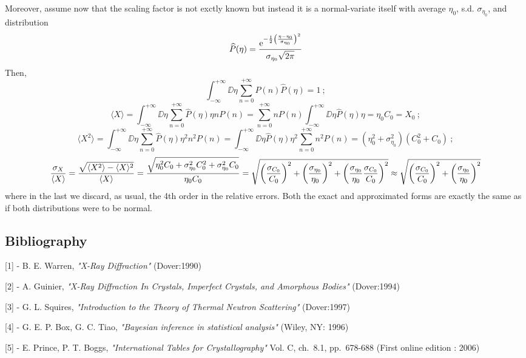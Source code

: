 Moreover, assume now that the scaling factor is not exctly known 
but instead it is a normal-variate itself with average $\eta_0$, s.d. 
$\sigma_{\eta_0}$, and distribution
\[
\widehat{P}(\eta)={\displaystyle{\frac{{\ensuremath{\displaystyle{
{\ensuremath{\mathrm{e}}}^{
-\frac{1}{2}
{\ensuremath{\left({
\frac{\eta-\eta_0}{\sigma_{\eta_0}}
}\right)}}^2
}
}}}}{{\ensuremath{\displaystyle{
\sigma_{\eta_0}\sqrt{2\pi}
}}}}}}
\]
Then,
\[
\int_{-\infty}^{+\infty}\DD{\eta}\mathop{\sum}_{n=0}^{+\infty}
P(n)\widehat{P}(\eta)=1\ ;
\]
\[
\langle X\rangle=\int_{-\infty}^{+\infty}\DD{\eta}\mathop{\sum}_{n=0}^{+\infty}
\widehat{P}(\eta)\eta nP(n)=
\mathop{\sum}_{n=0}^{+\infty}
 nP(n)
\int_{-\infty}^{+\infty}\DD{\eta} \widehat{P}(\eta)\eta
 =
\eta_0 C_0=X_0\ ;
\]
\[
\langle X^2\rangle=\int_{-\infty}^{+\infty}\DD{\eta}\mathop{\sum}_{n=0}^{+\infty}
\widehat{P}(\eta)\eta^2 n^2 P(n)=
\int_{-\infty}^{+\infty}\DD{\eta}\widehat{P}(\eta)\eta^2
\mathop{\sum}_{n=0}^{+\infty}
 n^2 P(n)
=
(\eta_0^2+\sigma_{\eta_0}^2)(C_0^2+C_0)\ ;
\]
\[
{\displaystyle{\frac{{\ensuremath{\displaystyle{\sigma_X}}}}{{\ensuremath{\displaystyle{\langle X\rangle}}}}}}={\displaystyle{\frac{{\ensuremath{\displaystyle{\sqrt{\langle X^2\rangle-\langle X\rangle^2}}}}}{{\ensuremath{\displaystyle{\langle X\rangle}}}}}}
={\displaystyle{\frac{{\ensuremath{\displaystyle{\sqrt{
\eta_0^2 C_0+\sigma_{\eta_0}^2C_0^2+\sigma_{\eta_0}^2 C_0
}}}}}{{\ensuremath{\displaystyle{\eta_0C_0}}}}}}=
\sqrt{
{\left({{\displaystyle{\frac{{\ensuremath{\displaystyle{ \sigma_{C_0}}}}}{{\ensuremath{\displaystyle{C_0}}}}}}}\right)}^2
+{\left({{\displaystyle{\frac{{\ensuremath{\displaystyle{\sigma_{\eta_0}}}}}{{\ensuremath{\displaystyle{\eta_0}}}}}}}\right)}^2+{\left({{\displaystyle{\frac{{\ensuremath{\displaystyle{\sigma_{\eta_0}}}}}{{\ensuremath{\displaystyle{\eta_0}}}}}}{\displaystyle{\frac{{\ensuremath{\displaystyle{\sigma_{C_0}}}}}{{\ensuremath{\displaystyle{C_0}}}}}}}\right)}^2
}\approx\sqrt{
{\left({{\displaystyle{\frac{{\ensuremath{\displaystyle{ \sigma_{C_0}}}}}{{\ensuremath{\displaystyle{C_0}}}}}}}\right)}^2
+{\left({{\displaystyle{\frac{{\ensuremath{\displaystyle{\sigma_{\eta_0}}}}}{{\ensuremath{\displaystyle{\eta_0}}}}}}}\right)}^2
}
\]
where in the last we discard, as usual, the 4th order in the relative errors. Both the exact and approximated forms 
are exactly the same as if both distributions were to be normal.





\subsection*{Bibliography}

[1] - B. E. Warren, {\textit{"X-Ray Diffraction"}} (Dover:1990)

[2] - A. Guinier, {\textit{"X-Ray Diffraction In Crystals, Imperfect Crystals, and Amorphous Bodies"}} (Dover:1994)

[3] - G. L. Squires,  {\textit{"Introduction to the Theory of Thermal Neutron Scattering"}} (Dover:1997)

[4] - G. E. P. Box, G. C. Tiao,  {\textit{"Bayesian inference in statistical analysis"}} (Wiley, NY: 1996)

[5] - E. Prince, P. T. Boggs, {\textit{"International Tables for Crystallography"}} Vol. C, ch.~8.1, pp.~678-688 (First online edition : 2006) 

